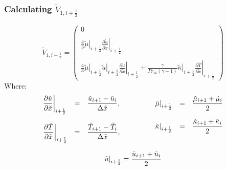 \documentclass[11pt, a4paper]{article}
\newcommand{\parder}[2]{\frac{\partial {#1}}{\partial {#2}}}
\begin{document}
\subsubsection{Calculating $\tilde{V}_{1,i+\frac{1}{2}}$}
\begin{equation}
    \tilde{V}_{1,i+\frac{1}{2}}=\begin{pmatrix}
        0 \\\\
        \displaystyle\frac{4}{3}\left.\tilde{\mu}\right|_{i+\frac{1}{2}}\left.\parder{\tilde{u}}{\tilde{x}}\right|_{i+\frac{1}{2}} \\\\
        \displaystyle\frac{4}{3}\left.\tilde{\mu}\right|_{i+\frac{1}{2}}\left.\tilde{u}\right|_{i+\frac{1}{2}}\left.\parder{\tilde{u}}{\tilde{x}}\right|_{i+\frac{1}{2}}+\frac{\gamma}{Pr_\infty\left(\gamma-1\right)}\left.\tilde{\kappa}\right|_{i+\frac{1}{2}}\left.\parder{\tilde{T}}{\tilde{x}}\right|_{i+\frac{1}{2}}
        \end{pmatrix}
\end{equation}
Where:
\begin{equation}
    \begin{array}{c}
        \begin{matrix}
            \begin{array}{lcl}
                \displaystyle\left.\parder{\tilde{u}}{\tilde{x}}\right|_{i+\frac{1}{2}} & = & \displaystyle\frac{\tilde{u}_{i+1}-\tilde{u}_i}{\Delta\tilde{x}}, \\\\
                \displaystyle\left.\parder{\tilde{T}}{\tilde{x}}\right|_{i+\frac{1}{2}} & = & \displaystyle\frac{\tilde{T}_{i+1}-\tilde{T}_i}{\Delta\tilde{x}},
            \end{array} \hspace{0.5cm}&\hspace{0.5cm} \begin{array}{lcl}
                \displaystyle\left.\tilde{\mu}\right|_{i+\frac{1}{2}} & = & \displaystyle\frac{\tilde{\mu}_{i+1}+\tilde{\mu}_i}{2} \\\\
                \displaystyle\left.\tilde{\kappa}\right|_{i+\frac{1}{2}} & = & \displaystyle\frac{\tilde{\kappa}_{i+1}+\tilde{\kappa}_i}{2} \\\\
            \end{array}
        \end{matrix}\\\\
        \displaystyle\left.\tilde{u}\right|_{i+\frac{1}{2}}=\frac{\tilde{u}_{i+1}+\tilde{u}_i}{2} \\\\
    \end{array}
\end{equation}
\end{document}
